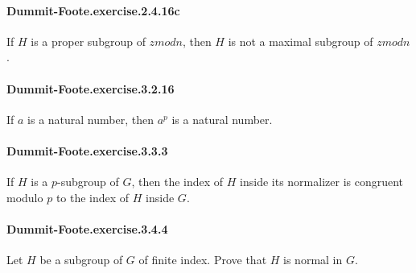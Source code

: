 \documentclass{article}
\begin{document}

\paragraph{Dummit-Foote.exercise.2.4.16c} If $H$ is a proper subgroup of $zmod n$, then $H$ is not a maximal subgroup of $zmod n$.



\paragraph{Dummit-Foote.exercise.3.2.16} If $a$ is a natural number, then $a ^ p$ is a natural number.

\paragraph{Dummit-Foote.exercise.3.3.3} If $H$ is a $p$-subgroup of $G$, then the index of $H$ inside its normalizer is congruent modulo $p$ to the index of $H$ inside $G$.

\paragraph{Dummit-Foote.exercise.3.4.4} Let $H$ be a subgroup of $G$ of finite index. Prove that $H$ is normal in $G$.

\end{document}
